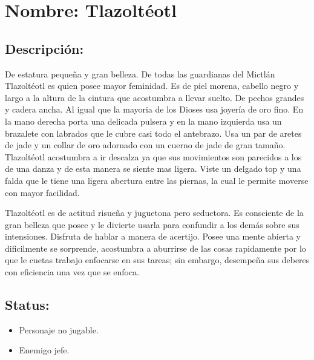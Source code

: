 \section{Nombre: Tlazoltéotl}  \label{per:tlazolteotl}
\subsection{Descripción: }  
De estatura pequeña y gran belleza. De todas las guardianas del Mictlán Tlazoltéotl es quien posee mayor feminidad. Es de piel morena, cabello negro y largo a la altura de la cintura que acostumbra a llevar suelto. De pechos grandes y cadera ancha. Al igual que la mayoria de los Dioses usa joyería de oro fino. En la mano derecha porta una delicada pulsera y en la mano izquierda usa un brazalete con labrados que le cubre casi todo el antebrazo. Usa un par de aretes de jade y un collar de oro adornado con un cuerno de jade de gran tamaño. Tlazoltéotl acostumbra a ir descalza ya que sus movimientos son parecidos a los de una danza y de esta manera se siente mas ligera. Viste un delgado top y una falda que le tiene una ligera abertura entre las piernas, la cual le permite moverse con mayor facilidad.
\\
\par
Tlazoltéotl es de actitud risueña y juguetona pero seductora. Es consciente de la gran belleza que posee y le divierte usarla para confundir a los demás sobre sus intensiones. Disfruta de hablar a manera de acertijo. Posee una mente abierta y dificilmente se sorprende, acostumbra a aburrirse de las cosas rapidamente por lo que le cuetas trabajo enfocarse en sus tareas; sin embargo, desempeña sus deberes con eficiencia una vez que se enfoca.    
\subsection{Status:}
	\begin{itemize}
		\item Personaje no jugable.
		\item Enemigo jefe.
	\end{itemize}
